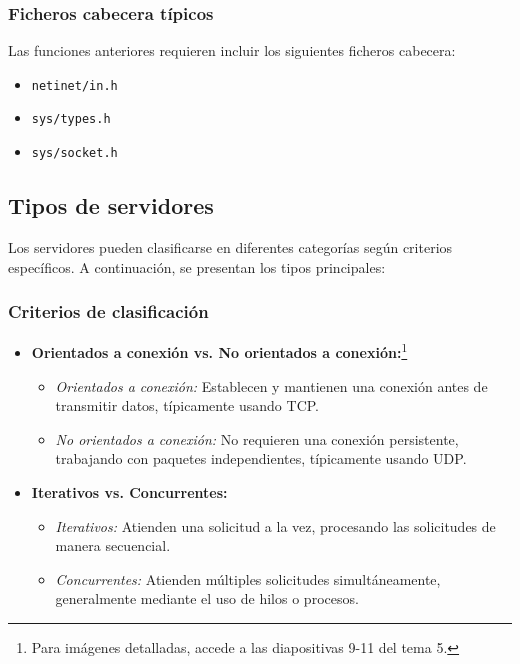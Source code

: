 \documentclass[a4paper,12pt]{article}
\begin{document}
\subsubsection{Ficheros cabecera típicos}

Las funciones anteriores requieren incluir los siguientes ficheros cabecera:

\begin{itemize}
    \item \texttt{netinet/in.h}
    \item \texttt{sys/types.h}
    \item \texttt{sys/socket.h}
\end{itemize}

\subsection{Tipos de servidores}

Los servidores pueden clasificarse en diferentes categorías según criterios específicos. A continuación, se presentan los tipos principales:

\subsubsection{Criterios de clasificación}

\begin{itemize}
    \item \textbf{Orientados a conexión vs. No orientados a conexión:}\footnote{Para imágenes detalladas, accede a las diapositivas 9-11 del tema 5.} 
    \begin{itemize}
        \item \emph{Orientados a conexión:} Establecen y mantienen una conexión antes de transmitir datos, típicamente usando TCP.
        \item \emph{No orientados a conexión:} No requieren una conexión persistente, trabajando con paquetes independientes, típicamente usando UDP.
    \end{itemize}
    \item \textbf{Iterativos vs. Concurrentes:}
    \begin{itemize}
        \item \emph{Iterativos:} Atienden una solicitud a la vez, procesando las solicitudes de manera secuencial.
        \item \emph{Concurrentes:} Atienden múltiples solicitudes simultáneamente, generalmente mediante el uso de hilos o procesos.
    \end{itemize}
\end{itemize}
\end{document}
